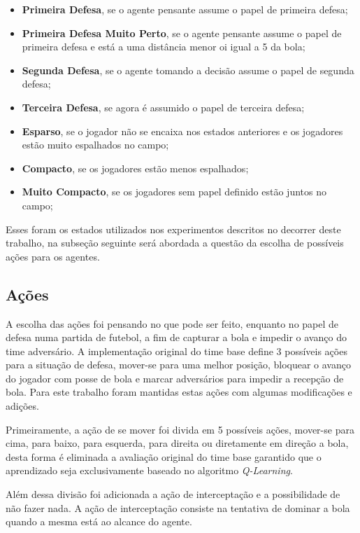 \begin{itemize}
    \item \textbf{Primeira Defesa}, se o agente pensante assume o papel de
    primeira defesa;
    \item \textbf{Primeira Defesa Muito Perto}, se o agente pensante assume o papel de
    primeira defesa e está a uma distância menor oi igual a 5 da bola;
    \item  \textbf{Segunda Defesa}, se o agente tomando a decisão assume o papel
    de segunda defesa;
    \item \textbf{Terceira Defesa}, se agora é assumido o papel de terceira
    defesa;
    \item \textbf{Esparso}, se o jogador não se encaixa nos estados anteriores e
    os jogadores estão muito espalhados no campo;
    \item \textbf{Compacto}, se os jogadores estão menos espalhados;
    \item \textbf{Muito Compacto}, se os jogadores sem papel definido estão
    juntos no campo;
\end{itemize}

Esses foram os estados utilizados nos experimentos descritos no decorrer deste
trabalho, na subseção seguinte será abordada a questão da escolha de possíveis
ações para os agentes.

\subsection{Ações}\label{actions}

A escolha das ações foi pensando no que pode ser feito, enquanto no papel de
defesa numa partida de futebol, a fim de capturar a bola e impedir o avanço do
time adversário. A implementação original do time base define 3 possíveis ações
para a situação de defesa, mover-se para uma melhor posição, bloquear o avanço
do jogador com posse de bola e marcar adversários para impedir a recepção de
bola. Para este trabalho foram mantidas estas ações com algumas modificações e
adições.

Primeiramente, a ação de se mover foi divida em 5 possíveis ações, mover-se para
cima, para baixo, para esquerda, para direita ou diretamente em direção a bola, desta forma é eliminada a
avaliação original do time base garantido que o aprendizado seja exclusivamente
baseado no algoritmo \textit{Q-Learning}.

Além dessa divisão foi adicionada a ação de interceptação e a possibilidade de
não fazer nada. A ação de interceptação consiste na tentativa de dominar a bola
quando a mesma está ao alcance do agente.


